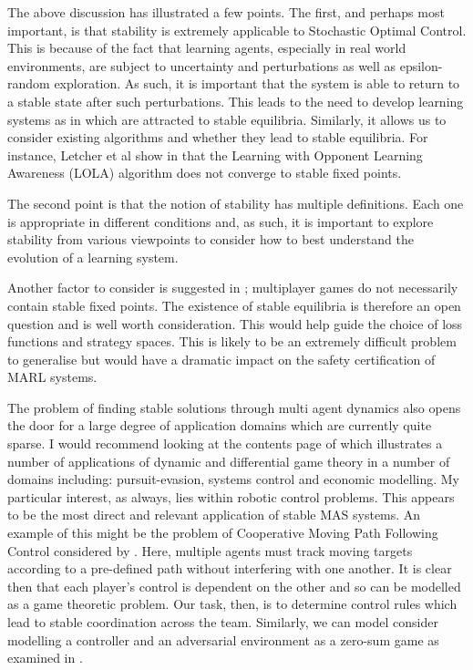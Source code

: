 \documentclass[preprint,11pt]{report}
\begin{document}
The above discussion has illustrated a few points. The first, and perhaps most important, is that
stability is extremely applicable to Stochastic Optimal Control. This is because of the fact
that learning agents, especially in real world environments, are subject to uncertainty and
perturbations as well as epsilon-random exploration. As such, it is important that the system is
able to return to a stable state after such perturbations. This leads to the need to develop
learning systems as in \cite{Letcher2019DifferentiableMechanics} which are attracted to stable
equilibria. Similarly, it allows us to consider existing algorithms and whether they lead to stable
equilibria. For instance, Letcher et al show in \cite{LetcherSTABLEGAMES} that the Learning with
Opponent Learning Awareness (LOLA) algorithm \cite{Foerster2018LearningAwareness} does not converge
to stable fixed points.

The second point is that the notion of stability has multiple definitions. Each one is appropriate
in different conditions and, as such, it is important to explore stability from various viewpoints
to consider how to best understand the evolution of a learning system. 

Another factor to consider is suggested in \cite{Milchtaich2007StaticGames}; multiplayer games do
not necessarily contain stable fixed points. The existence of stable equilibria is therefore an open
question and is well worth consideration. This would help guide the choice of loss functions and
strategy spaces. This is likely to be an extremely difficult problem to generalise but would have a
dramatic impact on the safety certification of MARL systems.

The problem of finding stable solutions through multi agent dynamics also opens the door for a large
degree of application domains which are currently quite sparse. I would recommend looking at the
contents page of \cite{Hamalainen1991DifferentialFinland} which illustrates a number of applications
of dynamic and differential game theory in a number of domains including: pursuit-evasion, systems
control and economic modelling. My particular interest, as always, lies within robotic control
problems. This appears to be the most direct and relevant application of stable MAS systems. An
example of this might be the problem of Cooperative Moving Path Following Control considered by
\cite{Reis2019RobustVehicles}. Here, multiple agents must track moving targets according to a
pre-defined path without interfering with one another. It is clear then that each player's control
is dependent on the other and so can be modelled as a game theoretic problem. Our task, then, is to
determine control rules which lead to stable coordination across the team. Similarly, we can model
consider modelling a controller and an adversarial environment as a zero-sum game as examined in
\cite{Marden2018AnnualControl}. 
\end{document}
